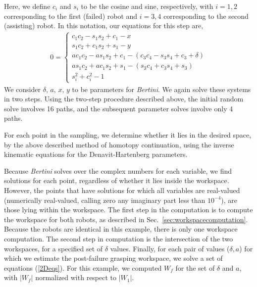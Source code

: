 \documentclass[12pt]{report}
\begin{document}
%
Here, we define $c_i$ and $s_i$ to be the cosine and sine, respectively, with $i=1,2$ corresponding to the first (failed) robot and $i=3,4$ corresponding to the second (assisting) 
robot. 
In this notation, our equations for this step are,
%
\begin{align}
0 = \left\{ \begin{array}{l}
c_1c_2 - s_1s_2 + c_1 - x  \\
s_1c_2 + c_1s_2 + s_1 - y \\
ac_1c_2 - as_1s_2 + c_1 - (c_3c_4 - s_3s_4 + c_3+ \delta) \\
as_1c_2 + ac_1s_2 + s_1 - (s_3c_4 + c_3s_4 + s_3)\\
s_i^2 + c_i^2 - 1  \end{array}
 \label{2Deqs} 
\right.
\end{align}
We consider $\delta$, $a$, $x$, $y$ to be parameters for \emph{Bertini}.  We again solve these systems in two steps.  Using the two-step procedure described above, the initial random solve involves 16 paths, and the subsequent parameter solves involve only 4 paths. 


%
  For each point in the sampling, we determine whether it lies in the desired space, by the above described method of homotopy continuation, using the inverse kinematic equations for the Denavit-Hartenberg parameters.  
  
  Because \emph{Bertini} solves over the complex numbers for each variable, we find solutions for each point, regardless of whether it lies inside the workspace.  However, the points that have solutions for which all variables are real-valued (numerically real-valued, calling zero any imaginary part less than $10^{-4}$), are those lying within the  workspace.    
The first step in the computation is to compute the workspace for both robots, as described in Sec.~\ref{sec:workspacecomputation}.  Because the robots are identical in this example, there is only one workspace computation.
The second step in computation is the intersection of the two workspaces, for a specified set of $\delta$ values.
Finally, for each pair of values ($\delta,a$) for which we estimate the post-failure grasping workspace, we solve a set of equations (\ref{2Deqs}).  For this example, we computed $W_f$ for the set of $\delta$ and $a$, with $|W_f|$ normalized with respect to $|W_1|$.
\end{document}
